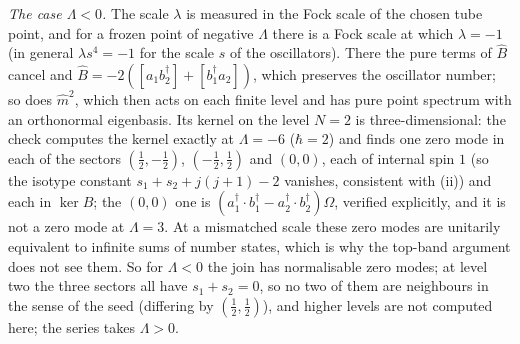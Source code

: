 \emph{The case $\Lambda < 0$.} The scale $\lambda$ is measured in the Fock scale of the chosen tube point, and for a frozen point of negative $\Lambda$ there is a Fock scale at which $\lambda = -1$ (in general $\lambda s^{4} = -1$ for the scale $s$ of the oscillators). There the pure terms of $\hat{B}$ cancel and $\hat{B} = -2([a_{1}b^{\dagger}_{2}] + [b^{\dagger}_{1}a_{2}])$, which preserves the oscillator number; so does $\hat{m}^{2}$, which then acts on each finite level and has pure point spectrum with an orthonormal eigenbasis. Its kernel on the level $N = 2$ is three-dimensional: the check computes the kernel exactly at $\Lambda = -6$ ($\hbar = 2$) and finds one zero mode in each of the sectors $(\tfrac12, -\tfrac12)$, $(-\tfrac12, \tfrac12)$ and $(0, 0)$, each of internal spin $1$ (so the isotype constant $s_{1} + s_{2} + j(j+1) - 2$ vanishes, consistent with (ii)) and each in $\ker\hat{B}$; the $(0, 0)$ one is $(a^{\dagger}_{1}\cdot b^{\dagger}_{1} - a^{\dagger}_{2}\cdot b^{\dagger}_{2})\Omega$, verified explicitly, and it is not a zero mode at $\Lambda = 3$. At a mismatched scale these zero modes are unitarily equivalent to infinite sums of number states, which is why the top-band argument does not see them. So for $\Lambda < 0$ the join has normalisable zero modes; at level two the three sectors all have $s_{1} + s_{2} = 0$, so no two of them are neighbours in the sense of the seed (differing by $(\tfrac12, \tfrac12)$), and higher levels are not computed here; the series takes $\Lambda > 0$.

